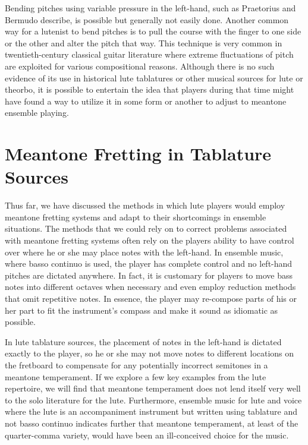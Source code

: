 Bending pitches using variable pressure in the left-hand, such as Praetorius and Bermudo
describe, is possible but generally not easily done.  Another common way for a lutenist to
bend pitches is to pull the course with the finger to one side or the other and alter the
pitch that way. This technique is very common in twentieth-century classical guitar
literature where extreme fluctuations of pitch are exploited for various compositional
reasons. Although there is no such evidence of its use in historical lute tablatures or
other musical sources for lute or theorbo, it is possible to entertain the idea that
players during that time might have found a way to utilize it in some form or another to
adjust to meantone ensemble playing.

\section{Meantone Fretting in Tablature Sources}

Thus far, we have discussed the methods in which lute players would employ meantone
fretting systems and adapt to their shortcomings in ensemble situations.  The methods that
we could rely on to correct problems associated with meantone fretting systems often rely
on the players ability to have control over where he or she may place notes with the
left-hand.  In ensemble music, where basso continuo is used, the player has complete
control and no left-hand pitches are dictated anywhere.  In fact, it is customary for
players to move bass notes into different octaves when necessary and even employ reduction
methods that omit repetitive notes.  In essence, the player may re-compose parts of his or
her part to fit the instrument's compass and make it sound as idiomatic as possible.

In lute tablature sources, the placement of notes in the left-hand is dictated exactly to
the player, so he or she may not move notes to different locations on the fretboard to
compensate for any potentially incorrect semitones in a meantone temperament.  If we
explore a few key examples from the lute repertoire, we will find that meantone
temperament does not lend itself very well to the solo literature for the lute.
Furthermore, ensemble music for lute and voice where the lute is an accompaniment
instrument but written using tablature and not basso continuo indicates further that
meantone temperament, at least of the quarter-comma variety, would have been an
ill-conceived choice for the music.





